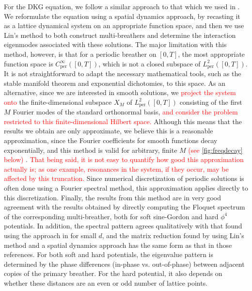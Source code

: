 \documentclass[12pt,reqno]{amsart}
\def\per{\textrm{per}}
\theoremstyle{definition}
\newcommand{\revised}[1]{ \textcolor{red}{#1} }
\begin{document}
For the DKG equation, we follow a similar approach to that which we used in \cite{Parker2020}. We reformulate the equation using a spatial dynamics approach, by recasting it as a lattice dynamical system on an appropriate function space, and then we use Lin's method to both construct multi-breathers and determine the interaction eigenmodes associated with these solutions. The major limitation with this method, however, is that for a periodic breather on $[0,T]$, the most appropriate function space is $C^\infty_\per([0,T])$, which is not a closed subspace of $L^2_\per([0,T])$. It is not straightforward to adapt the necessary mathematical tools, such as the stable manifold theorem and exponential dichotomies, to this space. As an alternative, since we are interested in smooth solutions, we 
\revised{
project the system onto	
} 
the finite-dimensional subspace $X_M$ of $L^2_\per([0,T])$ consisting of the first $M$ Fourier modes of the standard orthonormal basis, 
\revised{
and consider the problem restricted to this finite-dimensional Hilbert space.
}
Although this means that the results we obtain are only approximate, we believe this is a reasonable approximation, since the Fourier coefficients for smooth functions decay exponentially, and this method is valid for arbitrary, finite $M$
\revised{(see \cref{fig:freqdecay} below)}
.
\revised{
That being said, it is not easy to quantify how good this approximation actually is; as one example, resonances in the system, if they occur, may be affected by this truncation.
}
Since numerical discretization of periodic solutions is often done using a Fourier spectral method, this approximation applies directly to this discretization. Finally, the results from this method are in very good agreement with the results obtained by directly computing the Floquet spectrum of the corresponding multi-breather, both for soft sine-Gordon and hard $\phi^4$ potentials. In addition, the spectral pattern agrees qualitatively with that found using the approach in \cites{Pelinovsky2012,cuevas-maraver2016} for small $d$, and the matrix reduction found by using Lin's method and a spatial dynamics approach has the same form as that in those references.
For both soft and hard potentials, the eigenvalue pattern is determined by the phase differences (in-phase vs. out-of-phase) between adjacent copies of the primary breather. For the hard potential, it also depends on whether these distances are an even or odd number of lattice points.
\end{document}
